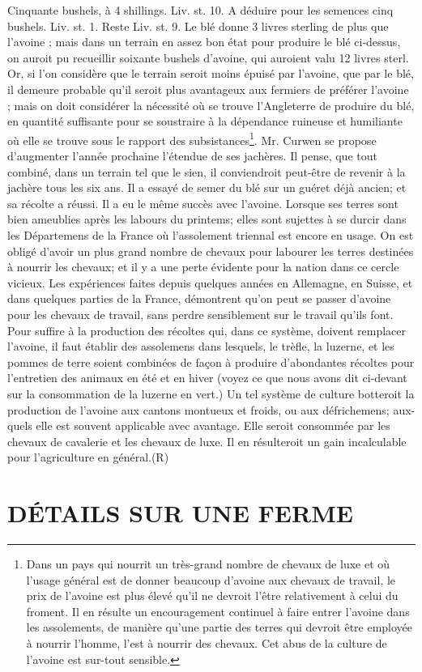 Cinquante bushels, à 4 shillings. Liv. st. 10.
A déduire pour les semences cinq bushels. Liv. st. 1.
Reste Liv. st. 9.
Le blé donne 3 livres sterling de plus que l'avoine ; mais dans un terrain en assez bon état pour produire le blé ci-dessus, on auroit pu recueillir soixante bushels d'avoine, qui auroient valu 12 livres sterl. Or, si l'on considère que le terrain seroit moins épuisé par l'avoine, que par le blé, il demeure probable qu'il seroit plus avantageux aux fermiers de préférer l'avoine ; mais on doit considérer la nécessité où se trouve l'Angleterre de produire du blé, en quantité suffisante pour se soustraire à la dépendance ruineuse et humiliante où elle se trouve sous le rapport des subsistances\footnote{Dans un pays qui nourrit un très-grand nombre de chevaux de luxe et où l'usage général est de donner beaucoup d'avoine aux chevaux de travail, le prix de l'avoine est plus élevé qu'il ne devroit l'être relativement à celui du froment. Il en résulte un encouragement continuel à faire entrer l'avoine dans les assolements, de manière qu'une partie des terres qui devroit être employée à nourrir l'homme, l'est à nourrir des chevaux. Cet abus de la culture de l'avoine est sur-tout sensible.}.\setcounter{page}{220} Mr. Curwen se propose d'augmenter l'année prochaine l'étendue de ses jachères. Il pense, que tout combiné, dans un terrain tel que le sien, il conviendroit peut-être de revenir à la jachère tous les six ans.
Il a essayé de semer du blé sur un guéret déjà ancien; et sa récolte a réussi. Il a eu le même succès avec l'avoine. Lorsque ses terres sont bien ameublies après les labours du printems; elles sont sujettes à se durcir
dans les Départemens de la France où l'assolement triennal est encore en usage. On est obligé d'avoir un plus grand nombre de chevaux pour labourer les terres destinées à nourrir les chevaux; et il y a une perte évidente pour la nation dans ce cercle vicieux. Les expériences faites depuis quelques années en Allemagne, en Suisse, et dans quelques parties de la France, démontrent qu'on peut se passer d'avoine pour les chevaux de travail, sans perdre sensiblement sur le travail qu'ils font. Pour suffire à la production des récoltes qui, dans ce système, doivent remplacer l'avoine, il faut établir des assolemens dans lesquels, le trèfle, la luzerne, et les pommes de terre soient combinées de façon à produire d'abondantes récoltes pour l'entretien des animaux en été et en hiver (voyez ce que nous avons dit ci-devant sur la consommation de la luzerne en vert.) Un tel système de culture botteroit la production de l'avoine aux cantons montueux et froids, ou aux défrichemens; aux-quels elle est souvent applicable avec avantage. Elle seroit consommée par les chevaux de cavalerie et les chevaux de luxe. Il en résulteroit un gain incalculable pour l'agriculture en général.(R)\setcounter{page}{221} \section{DÉTAILS SUR UNE FERME}
